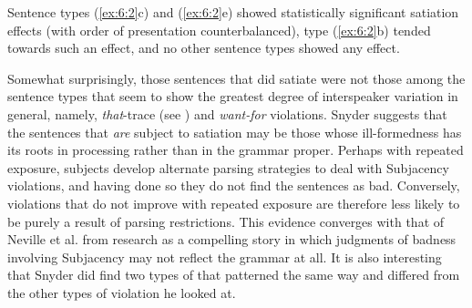 \noindent
 Sentence types (\ref{ex:6:2}c) and (\ref{ex:6:2}e) showed statistically significant satiation effects (with order of presentation counterbalanced), type (\ref{ex:6:2}b) tended towards such an effect, and no other sentence types showed any effect.

 Somewhat surprisingly, those sentences that did satiate were not those among the sentence types that seem to show the greatest degree of interspeaker variation in general, namely, \textit{that}-trace (see ) and \textit{want-for} violations. Snyder suggests that the sentences that \textit{are} subject to satiation may be those whose ill-formedness has its roots in processing rather than in the grammar proper. Perhaps with repeated exposure, subjects develop alternate parsing strategies to deal with Subjacency violations, and having done so they do not find the sentences as bad. Conversely, violations that do not improve with repeated exposure are therefore less likely to be purely a result of parsing restrictions. This evidence converges with that of Neville et al. from  research as a compelling story in which judgments of badness involving Subjacency may not reflect the grammar at all. It is also interesting that Snyder did find two types of  that patterned the same way and differed from the other types of violation he looked at.

